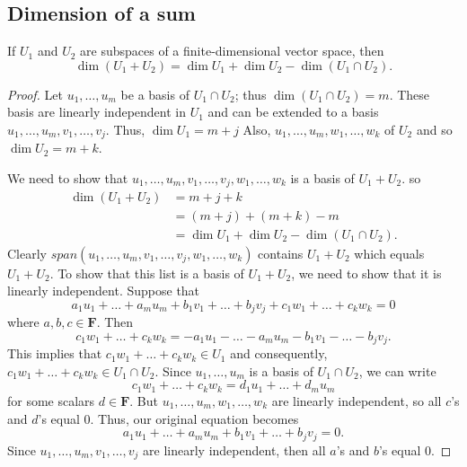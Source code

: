 \documentclass[11pt]{article}
\begin{document}
    \subsection{Dimension of a sum}

    If $U_1$ and $U_2$ are subspaces of a finite-dimensional vector space, then \[\dim(U_1 + U_2) = \dim U_1 + \dim U_2 - \dim(U_1 \cap U_2).\]

    \begin{proof}
        Let \(u_1, \dots, u_m\) be a basis of \(U_1 \cap U_2\); thus \(\dim (U_1 \cap U_2) = m\). These basis are linearly independent in $U_1$ and can be extended to a basis \(u_1, \dots, u_m, v_1, \dots, v_j\). Thus, \(\dim U_1 = m + j\) Also, \(u_1, \dots, u_m, w_1, \dots, w_k\) of $U_2$ and so \(\dim U_2 = m + k\).

        We need to show that \(u_1, \dots, u_m, v_1, \dots, v_j, w_1, \dots, w_k\) is a basis of \(U_1 + U_2\). so
        \begin{align*}
            \dim(U_1 + U_2) &= m + j + k \\
                            &= (m+j) + (m+k) - m \\
                            &= \dim U_1 + \dim U_2 - \dim (U_1 \cap U_2).
        \end{align*}
        Clearly \(span(u_1,\dots,u_m,v_1,\dots,v_j,w_1, \dots, w_k)\) contains \(U_1 + U_2\) which equals \(U_1 + U_2\). To show that this list is a basis of \(U_1 + U_2\), we need to show that it is linearly independent. Suppose that \[a_1 u_1 + \dots + a_m u_m + b_1 v_1 + \dots + b_j v_j + c_1 w_1 + \dots + c_k w_k = 0\] where \(a,b,c \in \textbf{F}\). Then \[c_1 w_1 + \dots + c_k w_k = -a_1 u_1 - \dots - a_m u_m - b_1 v_1 - \dots - b_j v_j.\] This implies that \(c_1 w_1 + \dots + c_k w_k \in U_1\) and consequently, \(c_1 w_1 + \dots + c_k w_k \in U_1 \cap U_2\). Since \(u_1, \dots, u_m\) is a basis of \(U_1 \cap U_2\), we can write \[c_1 w_1 + \dots + c_k w_k = d_1 u_1 + \dots + d_m u_m\] for some scalars \(d \in \textbf{F}\). But \(u_1, \dots, u_m, w_1, \dots, w_k\) are linearly independent, so all $c$'s and $d$'s equal 0. Thus, our original equation becomes \[ a_1 u_1 + \dots + a_m u_m + b_1 v_1 + \dots + b_j v_j = 0. \] Since \(u_1, \dots, u_m, v_1, \dots, v_j\) are linearly independent, then all $a$'s and $b$'s equal 0. 
    \end{proof}
\end{document}
